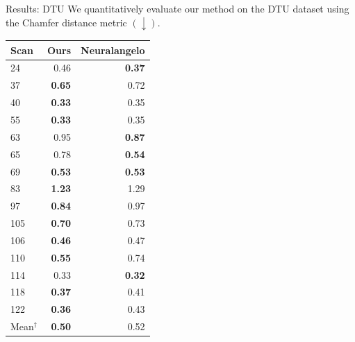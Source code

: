 \documentclass[10pt]{beamer}
\begin{document}
{
\begin{frame}{Results: \alert{DTU}}
    We quantitatively evaluate our method on the DTU dataset using the Chamfer distance metric \((\downarrow)\).
    \begin{table}[!htp]
        \scriptsize
        \centering
        \begin{tabular}{lrr}
            \toprule
            Scan             & Ours          & Neuralangelo  \\
            \hline
            24               & 0.46          & \textbf{0.37} \\
            37               & \textbf{0.65} & 0.72          \\
            40               & \textbf{0.33} & 0.35          \\
            55               & \textbf{0.33} & 0.35          \\
            63               & 0.95          & \textbf{0.87} \\
            65               & 0.78          & \textbf{0.54} \\
            69               & \textbf{0.53} & \textbf{0.53} \\
            83               & \textbf{1.23} & 1.29          \\
            97               & \textbf{0.84} & 0.97          \\
            105              & \textbf{0.70} & 0.73          \\
            106              & \textbf{0.46} & 0.47          \\
            110              & \textbf{0.55} & 0.74          \\
            114              & 0.33          & \textbf{0.32} \\
            118              & \textbf{0.37} & 0.41          \\
            122              & \textbf{0.36} & 0.43          \\
            Mean\(^\dagger\) & \textbf{0.50} & 0.52          \\
            \bottomrule
        \end{tabular}
    \end{table}
\end{frame}
}
\end{document}
